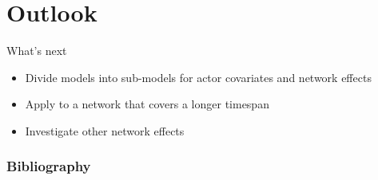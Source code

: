 \documentclass{beamer}
\begin{document}
	\section{Outlook}
	
	\begin{frame}{What's next}
		\begin{itemize}
			\item Divide models into sub-models for actor covariates and network effects
			\item Apply to a network that covers a longer timespan
			\item Investigate other network effects
		\end{itemize}
	\end{frame}
	
	\begin{frame}[allowframebreaks]
		\frametitle{Bibliography}	
		\printbibliography
	\end{frame}
\end{document}
